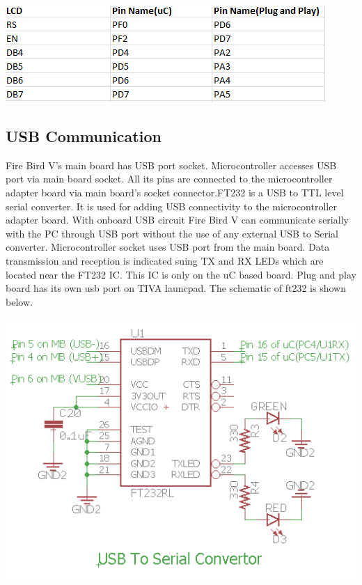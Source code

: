 \documentclass[a4paper,10pt,oneside]{article}
\begin{document}
{\begin{center}
		\vspace{1cm}		
		\includegraphics{lcdpin}
		\end{center}
	
	\vspace{4 cm}
	\subsection{\huge \textbf{USB Communication}}
	{Fire Bird V’s main board has USB port socket. Microcontroller accesses USB port via main
		board socket. All its pins are connected to the microcontroller adapter board via main board's
		socket connector.FT232 is a USB to TTL level serial converter. It is used for adding USB connectivity to the
		microcontroller adapter board. With onboard USB circuit Fire Bird V can communicate serially
		with the PC through USB port without the use of any external USB to Serial converter.
		Microcontroller socket uses USB port from the main board. Data transmission and reception is
		indicated suing TX and RX LEDs which are located near the FT232 IC. This IC is only on the uC based board. Plug and play board has its own usb port on TIVA launcpad. The schematic of ft232 is shown below.}
		\begin{center}
		\includegraphics{ft232}\\
		\end{center}
}
\end{document}
